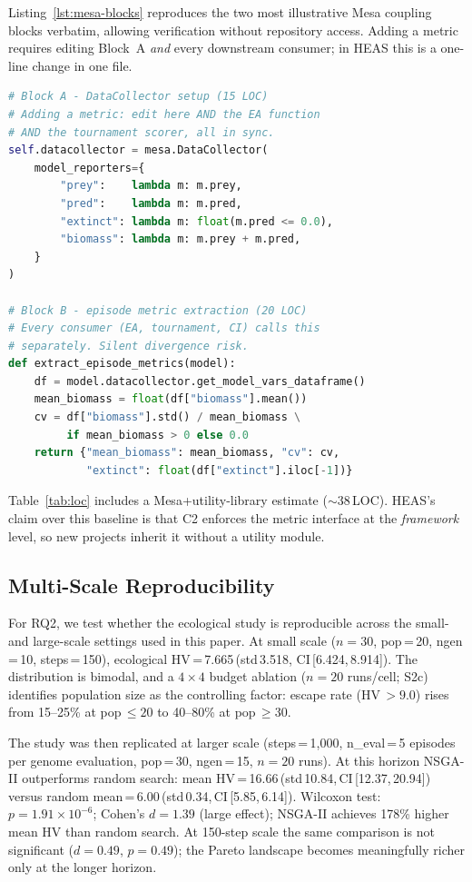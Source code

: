 \documentclass{wscpaperproc}
\begin{document}
Listing~\ref{lst:mesa-blocks} reproduces the two most illustrative
Mesa coupling blocks verbatim, allowing verification without repository
access. Adding a metric requires editing Block~A \emph{and} every downstream
consumer; in HEAS this is a one-line change in one file.

\begin{lstlisting}[caption={Mesa coupling code Blocks A and B (35 LOC from
    \texttt{experiments/mesa\_eco.py}). HEAS equivalent: zero LOC.},
    label=lst:mesa-blocks, language=Python]
# Block A - DataCollector setup (15 LOC)
# Adding a metric: edit here AND the EA function
# AND the tournament scorer, all in sync.
self.datacollector = mesa.DataCollector(
    model_reporters={
        "prey":    lambda m: m.prey,
        "pred":    lambda m: m.pred,
        "extinct": lambda m: float(m.pred <= 0.0),
        "biomass": lambda m: m.prey + m.pred,
    }
)

# Block B - episode metric extraction (20 LOC)
# Every consumer (EA, tournament, CI) calls this
# separately. Silent divergence risk.
def extract_episode_metrics(model):
    df = model.datacollector.get_model_vars_dataframe()
    mean_biomass = float(df["biomass"].mean())
    cv = df["biomass"].std() / mean_biomass \
         if mean_biomass > 0 else 0.0
    return {"mean_biomass": mean_biomass, "cv": cv,
            "extinct": float(df["extinct"].iloc[-1])}
\end{lstlisting}

Table~\ref{tab:loc} includes a Mesa+utility-library estimate ($\sim$38\,LOC).
HEAS's claim over this baseline is that C2 enforces the metric interface at the
\emph{framework} level, so new projects inherit it without a utility module.

\subsection{Multi-Scale Reproducibility}
\label{sec:multiscale}

For RQ2, we test whether the ecological study is reproducible across the
small- and large-scale settings used in this paper. At small scale
($n\!=\!30$, pop\,=\,20, ngen\,=\,10, steps\,=\,150),
ecological HV\,=\,7.665\,(std\,3.518, CI\,[6.424,\,8.914]).
The distribution is bimodal, and a $4\!\times\!4$ budget ablation
($n\!=\!20$ runs/cell; S2c) identifies population size as the controlling
factor: escape rate (HV\,$>\!9.0$) rises from 15--25\% at pop\,$\le\!20$ to
40--80\% at pop\,$\ge\!30$.

The study was then replicated at larger scale
(steps\,=\,1,000, n\_eval\,=\,5 episodes per genome evaluation, pop\,=\,30,
ngen\,=\,15, $n\!=\!20$ runs). At this horizon NSGA-II outperforms random
search: mean HV\,=\,16.66\,(std\,10.84,\,CI\,[12.37,\,20.94])
versus random mean\,=\,6.00\,(std\,0.34,\,CI\,[5.85,\,6.14]).
Wilcoxon test: $p\!=\!1.91\!\times\!10^{-6}$; Cohen's $d\!=\!1.39$
(large effect); NSGA-II achieves 178\% higher mean HV than random search.
At 150-step scale the same comparison is not significant ($d\!=\!0.49$,
$p\!=\!0.49$); the Pareto landscape becomes meaningfully richer only at the
longer horizon.
\end{document}
